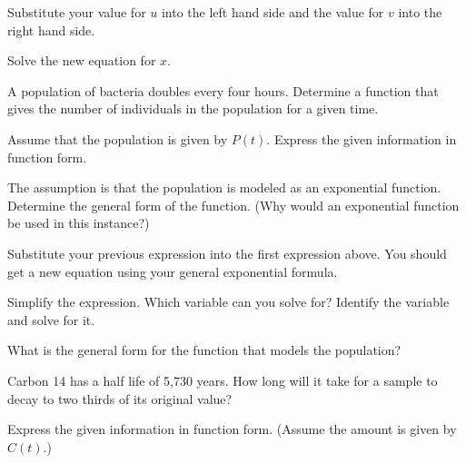 \begin{problem}
\begin{subproblem}
  \item Substitute your value for $u$ into the left hand side and the
    value for $v$ into the right hand side.
    \vfill
  \item Solve the new equation for $x$.
    \vfill
    \vfill
  \end{subproblem}

\clearpage

\item A population of bacteria doubles every four hours. Determine a
  function that gives the number of individuals in the population for
  a given time.
  \begin{subproblem}
  \item Assume that the population is given by $P(t)$. Express the
    given information in function form.

    \vfill
    
  \item The assumption is that the population is modeled as an
    exponential function. Determine the general form of the
    function. (Why would an exponential function be used in this
    instance?)
    
    \vfill
    
  \item Substitute your previous expression into the first expression
    above. You should get a new equation using your general
    exponential formula.
    
    \vfill
    
  \item Simplify the expression. Which variable can you solve for? Identify the variable and
    solve for it.
    
    \vfill
    \vfill
    
  \item What is the general form for the function that models the
    population?
    
    \vspace{1em}
    
  \end{subproblem}

\clearpage

\item Carbon 14 has a half life of 5,730 years. How long will it take
  for a sample to decay to two thirds of its original value?
  \begin{subproblem}
  \item Express the given information in function form. (Assume the
    amount is given by $C(t)$.)
    

\end{subproblem}
\end{problem}
